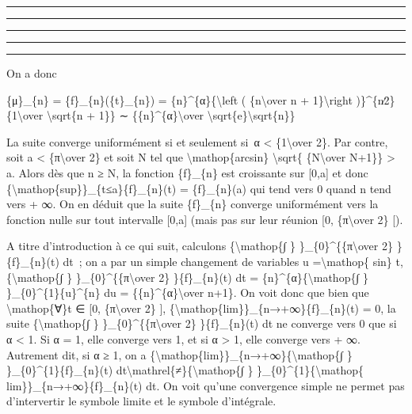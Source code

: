 \documentclass[]{article}
\begin{document}
\begin{center}\rule{3in}{0.4pt}\end{center}

\begin{center}\rule{3in}{0.4pt}\end{center}

\begin{center}\rule{3in}{0.4pt}\end{center}

\begin{center}\rule{3in}{0.4pt}\end{center}

\begin{center}\rule{3in}{0.4pt}\end{center}

On a donc

\{μ\}\_\{n\} = \{f\}\_\{n\}(\{t\}\_\{n\}) =
\{n\}\^{}\{α\}\{\textbackslash{}left ( \{n\textbackslash{}over n +
1\}\textbackslash{}right )\}\^{}\{n∕2\} \{1\textbackslash{}over
\textbackslash{}sqrt\{n + 1\}\} ∼ \{\{n\}\^{}\{α\}\textbackslash{}over
\textbackslash{}sqrt\{e\}\textbackslash{}sqrt\{n\}\}

La suite converge uniformément si et seulement si~α \textless{}
\{1\textbackslash{}over 2\}. Par contre, soit a \textless{}
\{π\textbackslash{}over 2\} et soit N tel que
\textbackslash{}mathop\{arcsin\} \textbackslash{}sqrt\{
\{N\textbackslash{}over N+1\}\} \textgreater{} a. Alors dès que n ≥ N,
la fonction \{f\}\_\{n\} est croissante sur {[}0,a{]} et donc
\{\textbackslash{}mathop\{sup\}\}\_\{t≤a\}\{f\}\_\{n\}(t) =
\{f\}\_\{n\}(a) qui tend vers 0 quand n tend vers + ∞. On en déduit que
la suite \{f\}\_\{n\} converge uniformément vers la fonction nulle sur
tout intervalle {[}0,a{]} (mais pas sur leur réunion {[}0,
\{π\textbackslash{}over 2\} {[}).

A titre d'introduction à ce qui suit, calculons
\{\textbackslash{}mathop\{∫ \} \}\_\{0\}\^{}\{\{π\textbackslash{}over
2\} \}\{f\}\_\{n\}(t) dt~; on a par un simple changement de variables u
=\textbackslash{}mathop\{ sin\} t, \{\textbackslash{}mathop\{∫ \}
\}\_\{0\}\^{}\{\{π\textbackslash{}over 2\} \}\{f\}\_\{n\}(t) dt =
\{n\}\^{}\{α\}\{\textbackslash{}mathop\{∫ \}
\}\_\{0\}\^{}\{1\}\{u\}\^{}\{n\} du =
\{\{n\}\^{}\{α\}\textbackslash{}over n+1\}. On voit donc que bien que
\textbackslash{}mathop\{∀\}t ∈ {[}0, \{π\textbackslash{}over 2\} {]},
\{\textbackslash{}mathop\{lim\}\}\_\{n→+∞\}\{f\}\_\{n\}(t) = 0, la suite
\{\textbackslash{}mathop\{∫ \} \}\_\{0\}\^{}\{\{π\textbackslash{}over
2\} \}\{f\}\_\{n\}(t) dt ne converge vers 0 que si α \textless{} 1. Si α
= 1, elle converge vers 1, et si α \textgreater{} 1, elle converge vers
+ ∞. Autrement dit, si α ≥ 1, on a
\{\textbackslash{}mathop\{lim\}\}\_\{n→+∞\}\{\textbackslash{}mathop\{∫
\} \}\_\{0\}\^{}\{1\}\{f\}\_\{n\}(t)
dt\textbackslash{}mathrel\{≠\}\{\textbackslash{}mathop\{∫ \}
\}\_\{0\}\^{}\{1\}\{\textbackslash{}mathop\{
lim\}\}\_\{n→+∞\}\{f\}\_\{n\}(t) dt. On voit qu'une convergence simple
ne permet pas d'intervertir le symbole limite et le symbole d'intégrale.
\end{document}
